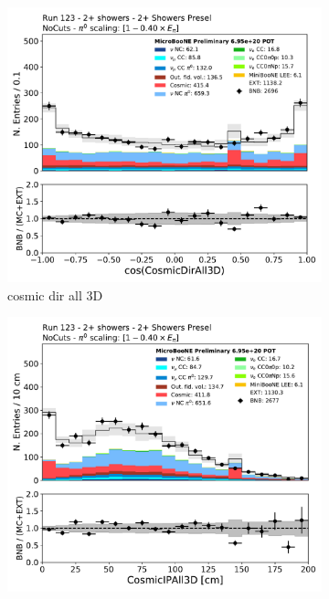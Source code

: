 \begin{figure}[H]
    \centering
    \begin{subfigure}{0.3\textwidth}
    \includegraphics[width=1.0\textwidth]{Sidebands/Figures/TwoShr_1e0pSel/Presel/CosmicDirAll3D.pdf}
    \caption{cosmic dir all 3D}
    \end{subfigure}
    \begin{subfigure}{0.3\textwidth}
    \includegraphics[width=1.0\textwidth]{Sidebands/Figures/TwoShr_1e0pSel/Presel/CosmicIPAll3D.pdf}

\end{subfigure}
\end{figure}
